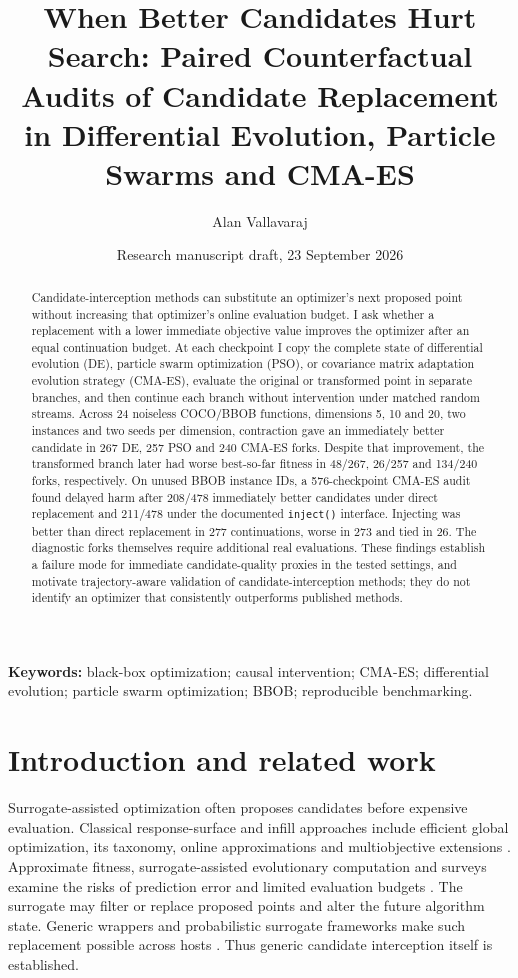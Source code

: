 \documentclass[11pt,a4paper]{article}
\title{When Better Candidates Hurt Search: Paired Counterfactual Audits of Candidate Replacement in Differential Evolution, Particle Swarms and CMA-ES}
\author{Alan Vallavaraj}
\date{Research manuscript draft, 23 September 2026}
\begin{document}
\maketitle
\begin{abstract}
Candidate-interception methods can substitute an optimizer's next proposed point without increasing that optimizer's online evaluation budget. I ask whether a replacement with a lower immediate objective value improves the optimizer after an equal continuation budget. At each checkpoint I copy the complete state of differential evolution (DE), particle swarm optimization (PSO), or covariance matrix adaptation evolution strategy (CMA-ES), evaluate the original or transformed point in separate branches, and then continue each branch without intervention under matched random streams. Across 24 noiseless COCO/BBOB functions, dimensions 5, 10 and 20, two instances and two seeds per dimension, contraction gave an immediately better candidate in 267 DE, 257 PSO and 240 CMA-ES forks. Despite that improvement, the transformed branch later had worse best-so-far fitness in 48/267, 26/257 and 134/240 forks, respectively. On unused BBOB instance IDs, a 576-checkpoint CMA-ES audit found delayed harm after 208/478 immediately better candidates under direct replacement and 211/478 under the documented \texttt{inject()} interface. Injecting was better than direct replacement in 277 continuations, worse in 273 and tied in 26. The diagnostic forks themselves require additional real evaluations. These findings establish a failure mode for immediate candidate-quality proxies in the tested settings, and motivate trajectory-aware validation of candidate-interception methods; they do not identify an optimizer that consistently outperforms published methods.
\end{abstract}

\noindent\textbf{Keywords:} black-box optimization; causal intervention; CMA-ES; differential evolution; particle swarm optimization; BBOB; reproducible benchmarking.

\section{Introduction and related work}
Surrogate-assisted optimization often proposes candidates before expensive evaluation. Classical response-surface and infill approaches include efficient global optimization, its taxonomy, online approximations and multiobjective extensions \cite{jones1998ego,jones2001,knowles2006,zhang2010}. Approximate fitness, surrogate-assisted evolutionary computation and surveys examine the risks of prediction error and limited evaluation budgets \cite{jin2002,jin2011survey,haftka2016,stork2020}. The surrogate may filter or replace proposed points and alter the future algorithm state. Generic wrappers and probabilistic surrogate frameworks make such replacement possible across hosts \cite{ong2003,lim2010,cai2020,blank2021psaf,gpsaf2022}. Thus generic candidate interception itself is established.
\end{document}
